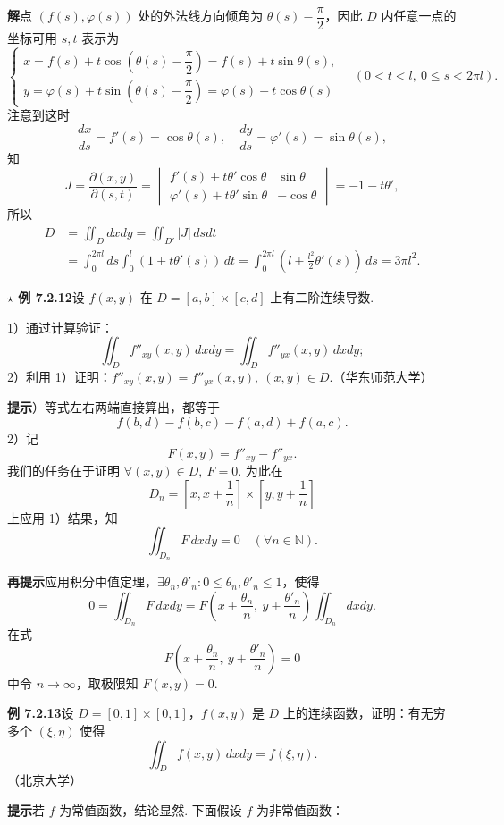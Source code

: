 \documentclass[UTF8,12pt,a4paper,fontset=fandol]{ctexart}
\begin{document}
\noindent\textbf{解}\quad 点 $(f(s),\varphi(s))$ 处的外法线方向倾角为 $\theta(s)-\dfrac\pi2$，因此 $D$ 内任意一点的坐标可用 $s,t$ 表示为
\[
\begin{cases}
x=f(s)+t\cos\left(\theta(s)-\dfrac\pi2\right)=f(s)+t\sin\theta(s),\\
y=\varphi(s)+t\sin\left(\theta(s)-\dfrac\pi2\right)=\varphi(s)-t\cos\theta(s)
\end{cases}
\quad(0<t<l,\ 0\le s<2\pi l).
\]
注意到这时
\[
\frac{dx}{ds}=f'(s)=\cos\theta(s),\quad \frac{dy}{ds}=\varphi'(s)=\sin\theta(s),
\]
知
\[
J=\frac{\partial(x,y)}{\partial(s,t)}
=\begin{vmatrix}
f'(s)+t\theta'\cos\theta&\sin\theta\\
\varphi'(s)+t\theta'\sin\theta&-\cos\theta
\end{vmatrix}
=-1-t\theta',
\]
所以
\[
\begin{aligned}
D&=\iint_Ddxdy=\iint_{D'}|J|\,dsdt\\
&=\int_0^{2\pi l}ds\int_0^l(1+t\theta'(s))\,dt
=\int_0^{2\pi l}\left(l+\frac{l^2}2\theta'(s)\right)\,ds=3\pi l^2.
\end{aligned}
\]

\noindent\textbf{$\star$ 例 7.2.12}\quad 设 $f(x,y)$ 在 $D=[a,b]\times[c,d]$ 上有二阶连续导数.

1）通过计算验证：
\[
\iint_D f''_{xy}(x,y)\,dxdy=\iint_D f''_{yx}(x,y)\,dxdy;
\]
2）利用 1）证明：$f''_{xy}(x,y)=f''_{yx}(x,y),\ (x,y)\in D$.（华东师范大学）

\noindent\textbf{提示}）等式左右两端直接算出，都等于
\[
f(b,d)-f(b,c)-f(a,d)+f(a,c).
\]
2）记
\[
F(x,y)=f''_{xy}-f''_{yx}.
\]
我们的任务在于证明 $\forall(x,y)\in D,\ F=0$. 为此在
\[
D_n=\left[x,x+\frac1n\right]\times\left[y,y+\frac1n\right]
\]
上应用 1）结果，知
\[
\iint_{D_n}F\,dxdy=0\quad(\forall n\in\mathbb N).
\]

\noindent\textbf{再提示}\quad 应用积分中值定理，$\exists\theta_n,\theta'_n:0\le\theta_n,\theta'_n\le1$，使得
\[
0=\iint_{D_n}F\,dxdy
=F\left(x+\frac{\theta_n}n,\ y+\frac{\theta'_n}n\right)\iint_{D_n}dxdy.
\]
在式
\[
F\left(x+\frac{\theta_n}n,\ y+\frac{\theta'_n}n\right)=0
\]
中令 $n\to\infty$，取极限知 $F(x,y)=0$.

\noindent\textbf{例 7.2.13}\quad 设 $D=[0,1]\times[0,1]$，$f(x,y)$ 是 $D$ 上的连续函数，证明：有无穷多个 $(\xi,\eta)$ 使得
\[
\iint_D f(x,y)\,dxdy=f(\xi,\eta).
\]
（北京大学）

\noindent\textbf{提示}\quad 若 $f$ 为常值函数，结论显然. 下面假设 $f$ 为非常值函数：
\end{document}
